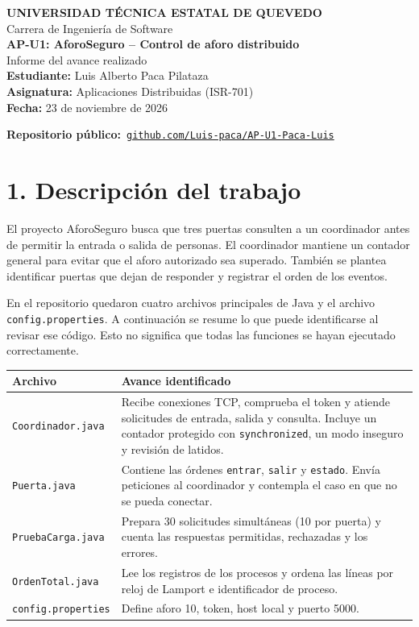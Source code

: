 \documentclass[11pt,a4paper]{article}
\begin{document}
\begin{center}
  {\large\bfseries UNIVERSIDAD TÉCNICA ESTATAL DE QUEVEDO}\\
  Carrera de Ingeniería de Software\\[5pt]
  {\large\bfseries AP-U1: AforoSeguro -- Control de aforo distribuido}\\
  Informe del avance realizado\\[4pt]
  \textbf{Estudiante:} Luis Alberto Paca Pilataza\\
  \textbf{Asignatura:} Aplicaciones Distribuidas (ISR-701)\\
  \textbf{Fecha:} 23 de noviembre de 2026
\end{center}

\textbf{Repositorio público:}\ \href{https://github.com/Luis-paca/AP-U1-Paca-Luis}{\texttt{github.com/Luis-paca/AP-U1-Paca-Luis}}

\section*{1. Descripción del trabajo}
El proyecto AforoSeguro busca que tres puertas consulten a un coordinador antes de permitir la entrada o salida de personas. El coordinador mantiene un contador general para evitar que el aforo autorizado sea superado. También se plantea identificar puertas que dejan de responder y registrar el orden de los eventos.

En el repositorio quedaron cuatro archivos principales de Java y el archivo \texttt{config.properties}. A continuación se resume lo que puede identificarse al revisar ese código. Esto no significa que todas las funciones se hayan ejecutado correctamente.

\begin{tabular}{@{}p{3.85cm}p{11.35cm}@{}}
\toprule
\textbf{Archivo} & \textbf{Avance identificado} \\
\midrule
\texttt{Coordinador.java} & Recibe conexiones TCP, comprueba el token y atiende solicitudes de entrada, salida y consulta. Incluye un contador protegido con \texttt{synchronized}, un modo inseguro y revisión de latidos. \\
\texttt{Puerta.java} & Contiene las órdenes \texttt{entrar}, \texttt{salir} y \texttt{estado}. Envía peticiones al coordinador y contempla el caso en que no se pueda conectar. \\
\texttt{PruebaCarga.java} & Prepara 30 solicitudes simultáneas (10 por puerta) y cuenta las respuestas permitidas, rechazadas y los errores. \\
\texttt{OrdenTotal.java} & Lee los registros de los procesos y ordena las líneas por reloj de Lamport e identificador de proceso. \\
\texttt{config.properties} & Define aforo 10, token, host local y puerto 5000. \\
\bottomrule
\end{tabular}
\end{document}
